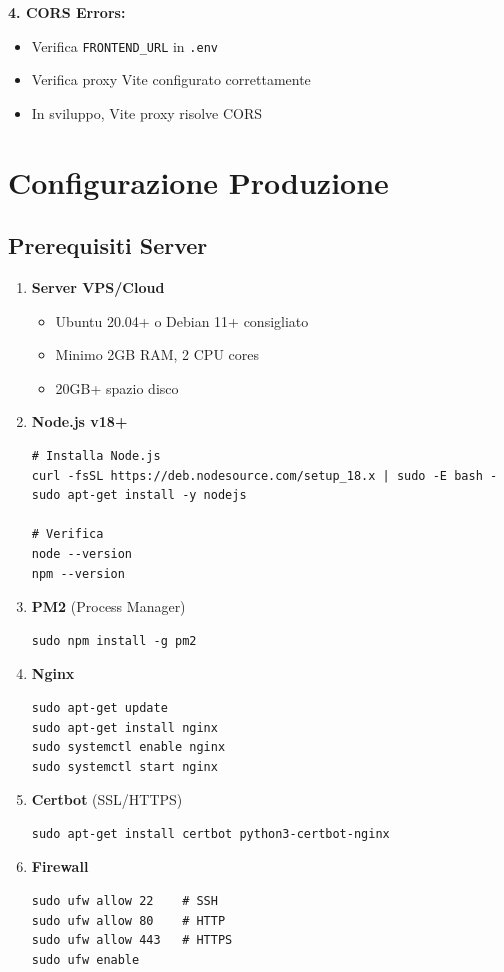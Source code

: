 \documentclass[11pt,a4paper]{article}
\newcommand{\code}[1]{\texttt{#1}}
\begin{document}
\textbf{4. CORS Errors:}
\begin{itemize}
    \item Verifica \code{FRONTEND_URL} in \code{.env}
    \item Verifica proxy Vite configurato correttamente
    \item In sviluppo, Vite proxy risolve CORS
\end{itemize}

\section{Configurazione Produzione}

\subsection{Prerequisiti Server}

\begin{enumerate}
    \item \textbf{Server VPS/Cloud}
    \begin{itemize}
        \item Ubuntu 20.04+ o Debian 11+ consigliato
        \item Minimo 2GB RAM, 2 CPU cores
        \item 20GB+ spazio disco
    \end{itemize}
    
    \item \textbf{Node.js v18+}
    \begin{lstlisting}
# Installa Node.js
curl -fsSL https://deb.nodesource.com/setup_18.x | sudo -E bash -
sudo apt-get install -y nodejs

# Verifica
node --version
npm --version
    \end{lstlisting}
    
    \item \textbf{PM2} (Process Manager)
    \begin{lstlisting}
sudo npm install -g pm2
    \end{lstlisting}
    
    \item \textbf{Nginx}
    \begin{lstlisting}
sudo apt-get update
sudo apt-get install nginx
sudo systemctl enable nginx
sudo systemctl start nginx
    \end{lstlisting}
    
    \item \textbf{Certbot} (SSL/HTTPS)
    \begin{lstlisting}
sudo apt-get install certbot python3-certbot-nginx
    \end{lstlisting}
    
    \item \textbf{Firewall}
    \begin{lstlisting}
sudo ufw allow 22    # SSH
sudo ufw allow 80    # HTTP
sudo ufw allow 443   # HTTPS
sudo ufw enable
    \end{lstlisting}
\end{enumerate}
\end{document}
